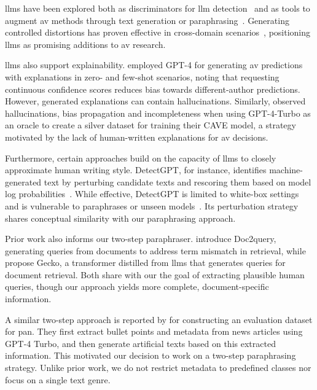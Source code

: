 \acp{llm} have been explored both as discriminators for \ac{llm} detection~\citep{futrzynski_pairwise_2021} and as tools to augment \ac{av} methods through text generation or paraphrasing~\citep{mao_raidar_2024,baradia_mirror_2025}. 
Generating controlled distortions has proven effective in cross-domain scenarios~\citep{bischoff_importance_2020}, positioning \acp{llm} as promising additions to \ac{av} research.

\acp{llm} also support explainability. 
\citet{hung_xai_av_llm_2023} employed GPT-4 for generating \ac{av} predictions with explanations in zero- and few-shot scenarios, noting that requesting continuous confidence scores reduces bias towards different-author predictions. 
However, generated explanations can contain hallucinations. 
Similarly, \citet{ramnath_cave_xai_llm_2025} observed hallucinations, bias propagation and incompleteness when using GPT-4-Turbo as an oracle to create a silver dataset for training their CAVE model, a strategy motivated by the lack of human-written explanations for \ac{av} decisions.

Furthermore, certain approaches build on the capacity of \acp{llm} to closely approximate human writing style.
DetectGPT, for instance, identifies machine-generated text by perturbing candidate texts and rescoring them based on model log probabilities~\citep{mitchell_detectgpt_2023}. 
While effective, DetectGPT is limited to white-box settings and is vulnerable to paraphrases or unseen models~\citep{Wu_ODD_challenges_2025}. 
Its perturbation strategy shares conceptual similarity with our paraphrasing approach.

Prior work also informs our two-step paraphraser. 
\citet{nogueira_doc2query_2019} introduce Doc2query, generating queries from documents to address term mismatch in retrieval, while \citet{lee_gecko_2024} propose Gecko, a transformer distilled from \acp{llm} that generates queries for document retrieval. 
Both share with our \pextractor{} the goal of extracting plausible human queries, though our approach yields more complete, document-specific information.

A similar two-step approach is reported by \citet{bevendorff_overview_2024} for constructing an evaluation dataset for \acs{pan}.
They first extract bullet points and metadata from news articles using GPT-4 Turbo, and then generate artificial texts based on this extracted information. 
This motivated our decision to work on a two-step paraphrasing strategy. 
Unlike prior work, we do not restrict metadata to predefined classes nor focus on a single text genre.


